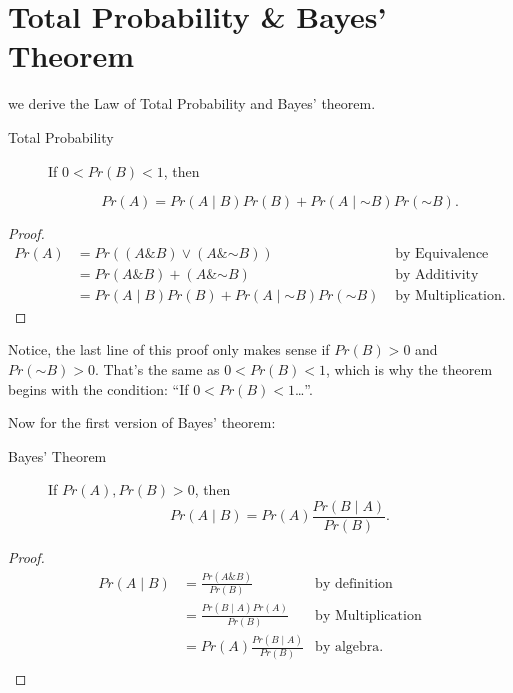 \documentclass[justified]{tufte-book}
\newcommand{\given}{\mid}
\renewcommand{\neg}{\mathbin{\sim}}
\renewcommand{\wedge}{\mathbin{\&}}
\newcommand{\p}{Pr}
\theoremstyle{definition}
\theoremstyle{definition}
\theoremstyle{definition}
\theoremstyle{remark}
\let\BeginKnitrBlock\begin \let\EndKnitrBlock\end
\begin{document}
\hypertarget{total-probability-bayes-theorem}{%
\section*{Total Probability \& Bayes'
Theorem}\label{total-probability-bayes-theorem}}

 we derive the Law of Total Probability and Bayes'
theorem.

\begin{description}
\item[Total Probability]
If \(0 < \p(B) < 1\), then

\[ \p(A) = \p(A \given B)\p(B) + \p(A \given  \neg B)\p(\neg B). \]
\end{description}

\BeginKnitrBlock{proof}
{} \[
  \begin{aligned}
    \p(A) &= \p((A \wedge B) \vee (A \wedge \neg B)) & \mbox{ by Equivalence}\\
          &= \p(A \wedge B) + (A \wedge \neg B) & \mbox{ by Additivity}\\
          &= \p(A \given B)\p(B) + \p(A \given \neg B)\p(\neg B) & \mbox{ by Multiplication.}
  \end{aligned}
\]
\EndKnitrBlock{proof}

Notice, the last line of this proof only makes sense if \(\p(B) > 0\)
and \(\p(\neg B) > 0\). That's the same as \(0 < \p(B) < 1\), which is
why the theorem begins with the condition: ``If
\(0 < \p(B) < 1\)\ldots{}''.

Now for the first version of Bayes' theorem:

\begin{description}
\item[Bayes' Theorem]
If \(\p(A),\p(B)>0\), then
\[ \p(A \given B) = \p(A)\frac{\p(B \given A)}{\p(B)}. \]
\end{description}

\BeginKnitrBlock{proof}
{} \[
  \begin{aligned}
    \p(A \given B) &= \frac{\p(A \wedge B)}{\p(B)} & \mbox{by definition}\\
              &= \frac{\p(B \given A)\p(A)}{\p(B)} & \mbox{by Multiplication}\\
              &= \p(A)\frac{\p(B \given A)}{\p(B)} & \mbox{by algebra.}\\
  \end{aligned}
\]
\EndKnitrBlock{proof}
\end{document}
